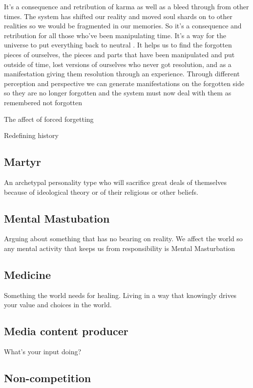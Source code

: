 It's a consequence and retribution of karma as well as a bleed through
from other times. The system has shifted our reality and moved soul
shards on to other realities so we would be fragmented in our memories.
So it's a consequence and retribution for all those who've been
manipulating time. It's a way for the universe to put everything back to
neutral . It helps us to find the forgotten pieces of ourselves, the
pieces and parts that have been manipulated and put outside of time,
lost versions of ourselves who never got resolution, and as a
manifestation giving them resolution through an experience. Through
different perception and perspective we can generate manifestations on
the forgotten side so they are no longer forgotten and the system must
now deal with them as remembered not forgotten

The affect of forced forgetting

Redefining history

\subsection{Martyr}\label{martyr}

An archetypal personality type who will sacrifice great deals of
themselves because of ideological theory or of their religious or other
beliefs.

\subsection{Mental Mastubation}\label{mental-mastubation}

Arguing about something that has no bearing on reality. We affect the
world so any mental activity that keeps us from responsibility is Mental
Masturbation

\subsection{Medicine}\label{medicine}

Something the world needs for healing. Living in a way that knowingly
drives your value and choices in the world.

\subsection{Media content producer}\label{media-content-producer}

What's your input doing?

\subsection{Non-competition}\label{non-competition}

